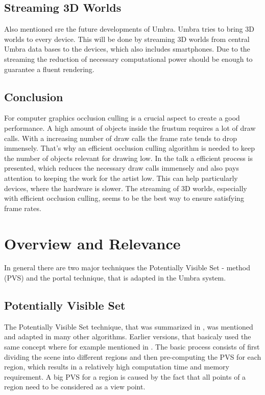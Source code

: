 \documentclass[a4paper]{article}
\begin{document}
\subsection{Streaming 3D Worlds}
Also mentioned sre the future developments of Umbra. Umbra tries to bring 3D worlds to every device.
This will be done by streaming 3D worlds from central Umbra data bases to the devices, which also includes smartphones. Due to the streaming the reduction of necessary computational power should be enough to guarantee a fluent rendering.

\subsection{Conclusion}

For computer graphics occlusion culling is a crucial aspect to create a good performance.
A high amount of objects inside the frustum requires a lot of draw calls. With a increasing number of draw calls the frame rate tends to drop immensely. 
That's why an efficient occlusion culling algorithm is needed to keep the number of objects relevant for drawing low.\newline
In the talk a efficient process is presented, which reduces the necessary draw calls immensely and also pays attention to keeping the work for the artist low.\newline
This can help particularly devices, where the hardware is slower.
The streaming of 3D worlds, especially with efficient occlusion culling, seems to be the best way to ensure satisfying frame rates.

\section{Overview and Relevance}


In general there are two major techniques the Potentially Visible Set - method (PVS) and the portal technique, that is adapted in the Umbra system.

\subsection{Potentially Visible Set}
The Potentially Visible Set technique, that was summarized in \cite{pvs}, was mentioned and adapted in many other algorithms. Earlier versions, that basicaly used the same concept where for example mentioned in \cite{pvs2}.  The basic process consists of first dividing the scene into different regions and then pre-computing the PVS for each region, which results in a relatively high computation time and memory requirement.
 A big PVS for a region is caused by the fact that all points of a region need to be considered as a view point.
\end{document}
